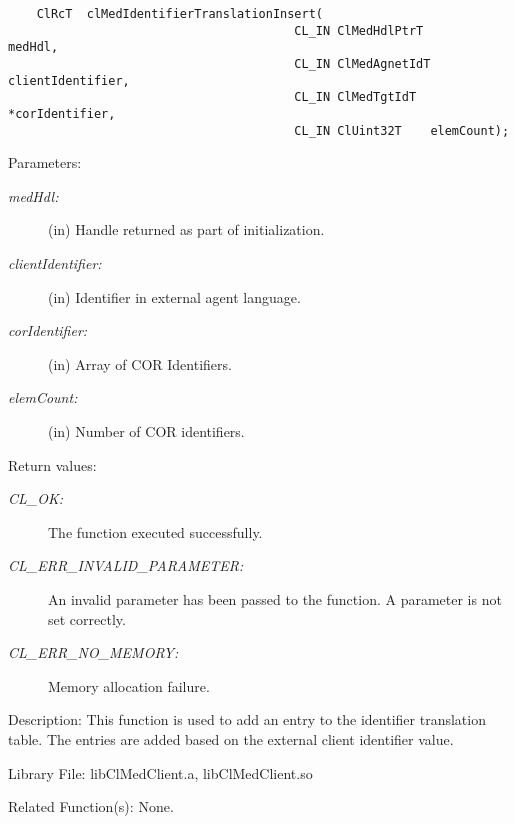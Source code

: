 \begin{flushleft}
\begin{Desc}
\footnotesize\begin{verbatim}    ClRcT  clMedIdentifierTranslationInsert(
                              			CL_IN ClMedHdlPtrT      medHdl,
                              			CL_IN ClMedAgnetIdT   clientIdentifier,
                              			CL_IN ClMedTgtIdT    *corIdentifier,
                              			CL_IN ClUint32T    elemCount);
\end{verbatim}
\normalsize
\end{Desc}
\begin{Desc}
\item[Parameters:]
\begin{description}
\item[{\em med\-Hdl:}](in) Handle returned as part of initialization. 
\item[{\em client\-Identifier:}](in) Identifier in external agent language. 
\item[{\em cor\-Identifier:}](in) Array of COR Identifiers. 
\item[{\em elem\-Count:}](in) Number of COR identifiers.\end{description}
\end{Desc}
\begin{Desc}
\item[Return values:]
\begin{description}
\item[{\em CL\_\-OK:}]The function executed successfully. 
\item[{\em CL\_\-ERR\_\-INVALID\_\-PARAMETER:}]An invalid parameter has been passed to the function. A parameter is not set correctly. 
\item[{\em CL\_\-ERR\_\-NO\_\-MEMORY:}]Memory allocation failure.\end{description}
\end{Desc}
\begin{Desc}
\item[Description:]This function is used to add an entry to the identifier translation table. The entries are added based on the external client 
identifier 
value.\end{Desc}
\begin{Desc}
\item[Library File:]lib\-Cl\-Med\-Client.a, lib\-Cl\-Med\-Client.so\end{Desc}
\begin{Desc}
\item[Related Function(s):] None. \end{Desc}
\newpage



\end{flushleft}
